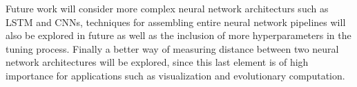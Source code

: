 \documentclass[journal]{IEEEtran}
\begin{document}
Future work will consider more complex neural network architecturs such as LSTM and CNNs, techniques for assembling entire neural network pipelines will also be explored in future as well as the inclusion of more hyperparameters in the tuning process. Finally a better way of measuring distance between two neural network architectures will be explored, since this last element is of high importance for applications such as visualization and evolutionary computation.

%
\end{document}
